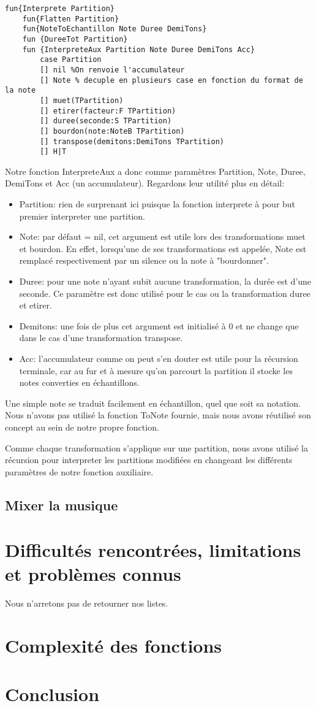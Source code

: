 \documentclass[a4paper,12pt]{report}
\begin{document}
\begin{lstlisting}[frame=single] 
fun{Interprete Partition}
	fun{Flatten Partition}
	fun{NoteToEchantillon Note Duree DemiTons}
	fun {DureeTot Partition}
	fun {InterpreteAux Partition Note Duree DemiTons Acc}
		case Partition
		[] nil %On renvoie l'accumulateur
		[] Note % decuple en plusieurs case en fonction du format de la note
		[] muet(TPartition)
		[] etirer(facteur:F TPartition)
		[] duree(seconde:S TPartition)
		[] bourdon(note:NoteB TPartition)
		[] transpose(demitons:DemiTons TPartition)
		[] H|T			
\end{lstlisting}

Notre fonction InterpreteAux a donc comme paramètres Partition, Note, Duree, DemiTons et Acc (un accumulateur). Regardons leur utilité plus en détail:
\begin{itemize}
\item Partition: rien de surprenant ici puisque la fonction interprete à pour but premier interpreter une partition. 
\item Note: par défaut = nil, cet argument est utile lors des transformations muet et bourdon. En effet, lorsqu'une de ses transformations est appelée, Note est remplacé respectivement par un silence ou la note à "bourdonner".  
\item Duree: pour une note n'ayant subit aucune transformation, la durée est d'une seconde. Ce paramètre est donc utilisé pour le cas ou la transformation duree et etirer.
\item Demitons: une fois de plus cet argument est initialisé à 0 et ne change que dans le cas d'une transformation transpose.
\item Acc: l'accumulateur comme on peut s'en douter est utile pour la récursion terminale, car au fur et à mesure qu'on parcourt la partition il stocke les notes converties en échantillons. 
\end{itemize}

Une simple note se traduit facilement en échantillon, quel que soit sa notation. Nous n'avons pas utilisé la fonction ToNote fournie, mais nous avons réutilisé son concept au sein de notre propre fonction. 

Comme chaque transformation s'applique sur une partition, nous avons utilisé la récursion pour interpreter les partitions modifiées en changeant les différents paramètres de notre fonction auxiliaire.

\subsection{Mixer la musique}


\section{Difficultés rencontrées, limitations et problèmes connus}
Nous n'arretons pas de retourner nos listes.

\section{Complexité des fonctions}

\section{Conclusion}
\end{document}
